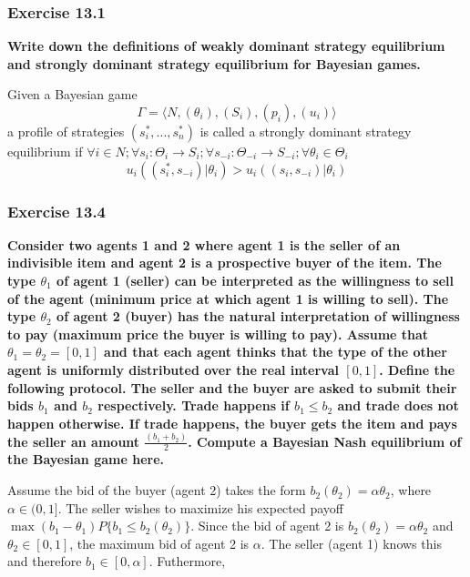 \documentclass[12pt, a4paper]{article}
\begin{document}
\subsubsection*{Exercise 13.1}

\textbf{Write down the definitions of weakly dominant strategy equilibrium and strongly dominant strategy equilibrium for Bayesian games.}

Given a Bayesian game
\[ \Gamma = \langle N,(\theta_i),(S_i),(p_i),(u_i)\rangle \]
a profile of strategies $(s_i^*, ..., s_n^*)$ is called a strongly dominant strategy equilibrium if $\forall i\in N; \forall s_i : \Theta_i \rightarrow S_i; \forall s_{-i} : \Theta_{-i} \rightarrow S_{-i}; \forall \theta_i \in \Theta_i$
\[u_i((s_i^*, s_{-i})|\theta_i) > u_i((s_i, s_{-i})|\theta_i)\]


\subsubsection*{Exercise 13.4}

\textbf{Consider two agents 1 and 2 where agent 1 is the seller of an indivisible item and agent 2 is a prospective buyer of the item. The type $\theta_1$ of agent 1 (seller) can be interpreted as the willingness to sell of the agent (minimum price at which agent 1 is willing to sell). The type $\theta_2$ of agent 2 (buyer) has the natural interpretation of willingness to pay (maximum price the buyer is willing to pay). Assume that $\theta_1 = \theta_2 = [0, 1]$ and that each agent thinks that the type of the other agent is uniformly distributed over the real interval $[0, 1]$. Define the following protocol. The seller and the buyer are asked to submit their bids $b_1$ and $b_2$ respectively. Trade happens if $b_1 \leq b_2$ and trade does not happen otherwise. If trade happens, the buyer gets the item and pays the seller an amount $\frac{(b_1+b_2)}{2}$. Compute a Bayesian Nash equilibrium of the Bayesian game here.}

Assume the bid of the buyer (agent 2) takes the form $b_2(\theta_2) = \alpha\theta_2$, where $\alpha \in (0,1]$. The seller wishes to maximize his expected payoff $\max(b_1 - \theta_1)P\{b_1 \leq b_2(\theta_2)\}$. Since the bid of agent 2 is $b_2(\theta_2)=\alpha\theta_2$ and $\theta_2 \in [0,1]$, the maximum bid of agent 2 is $\alpha$. The seller (agent 1) knows this and therefore $b_1 \in [0, \alpha]$. Futhermore,
\end{document}
